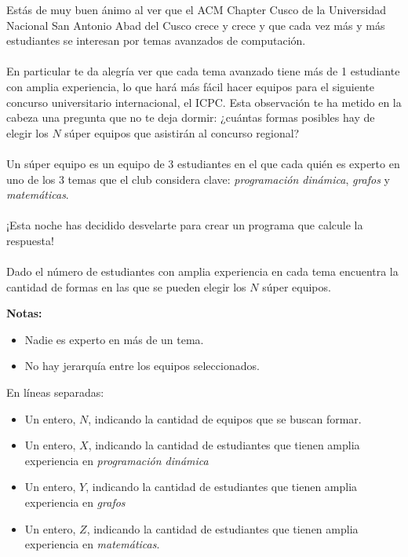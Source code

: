 
Estás de muy buen ánimo al ver que el ACM Chapter Cusco de la Universidad Nacional San Antonio Abad del Cusco crece y crece y que cada vez más y más estudiantes se interesan por temas avanzados de computación.
\\\\
En particular te da alegría ver que cada tema avanzado tiene más de 1 estudiante con amplia experiencia, lo que hará más fácil hacer equipos para el siguiente concurso universitario internacional, el ICPC. Esta observación te ha metido en la cabeza una pregunta que no te deja dormir: ¿cuántas formas posibles hay de elegir los $N$ súper equipos que asistirán al concurso regional?
\\\\
Un súper equipo es un equipo de 3 estudiantes en el que cada quién es experto en uno de los 3 temas que el club considera clave: \emph{programación dinámica}, \emph{grafos} y \emph{matemáticas}.
\\\\
¡Esta noche has decidido desvelarte para crear un programa que calcule la respuesta!
\\\\
Dado el número de estudiantes con amplia experiencia en cada tema encuentra la cantidad de formas en las que se pueden elegir los $N$ súper equipos.

\textbf{Notas:}
\begin{itemize}
    \item Nadie es experto en más de un tema.
    \item No hay jerarquía entre los equipos seleccionados.
\end{itemize}


En líneas separadas:
\begin{itemize}
    \item Un entero, $N$, indicando la cantidad de equipos que se buscan formar.
    \item Un entero, $X$, indicando la cantidad de estudiantes que tienen amplia experiencia en \emph{programación dinámica}
    \item Un entero, $Y$, indicando la cantidad de estudiantes que tienen amplia experiencia en \emph{grafos}
    \item Un entero, $Z$, indicando la cantidad de estudiantes que tienen amplia experiencia en \emph{matemáticas}.
\end{itemize}

